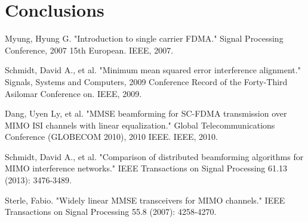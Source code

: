 \documentclass[12pt,a4paper,notitlepage,twoside,headsepline]{scrartcl}
\begin{document}
\section{Conclusions}


\begin{thebibliography}{Kop96}
Myung, Hyung G. "Introduction to single carrier FDMA." Signal Processing Conference, 2007 15th European. IEEE, 2007.


Schmidt, David A., et al. "Minimum mean squared error interference alignment." Signals, Systems and Computers, 2009 Conference Record of the Forty-Third Asilomar Conference on. IEEE, 2009.

Dang, Uyen Ly, et al. "MMSE beamforming for SC-FDMA transmission over MIMO ISI channels with linear equalization." Global Telecommunications Conference (GLOBECOM 2010), 2010 IEEE. IEEE, 2010.	

Schmidt, David A., et al. "Comparison of distributed beamforming algorithms for MIMO interference networks." IEEE Transactions on Signal Processing 61.13 (2013): 3476-3489.

Sterle, Fabio. "Widely linear MMSE transceivers for MIMO channels." IEEE Transactions on Signal Processing 55.8 (2007): 4258-4270.



\end{thebibliography}



\end{document}
